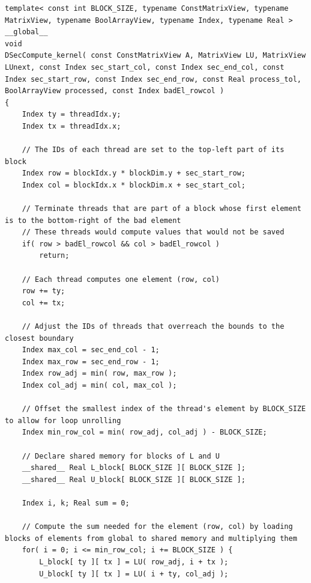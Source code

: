 \begin{lstlisting}[caption={The implementation of the \code{DSecCompute\_kernel()} kernel which computes one iteration of a diagonal section.
Note that the matrices, vectors, and arrays are passed using their views, and the scalar values are copied to the local memory of each thread.},label={Listing:implementation->decomposition-project->implemented-solutions->decomposers->ICMxPP->kernels->diagonal-compute},escapechar=@]
template< const int BLOCK_SIZE, typename ConstMatrixView, typename MatrixView, typename BoolArrayView, typename Index, typename Real >
__global__
void
DSecCompute_kernel( const ConstMatrixView A, MatrixView LU, MatrixView LUnext, const Index sec_start_col, const Index sec_end_col, const Index sec_start_row, const Index sec_end_row, const Real process_tol, BoolArrayView processed, const Index badEl_rowcol )
{
	Index ty = threadIdx.y;
	Index tx = threadIdx.x;
	
	// The IDs of each thread are set to the top-left part of its block
	Index row = blockIdx.y * blockDim.y + sec_start_row;
	Index col = blockIdx.x * blockDim.x + sec_start_col;
	
	// Terminate threads that are part of a block whose first element is to the bottom-right of the bad element
	// These threads would compute values that would not be saved
	if( row > badEl_rowcol && col > badEl_rowcol )
		return;
	
	// Each thread computes one element (row, col)
	row += ty;
	col += tx;
	
	// Adjust the IDs of threads that overreach the bounds to the closest boundary
	Index max_col = sec_end_col - 1;
	Index max_row = sec_end_row - 1;
	Index row_adj = min( row, max_row );
	Index col_adj = min( col, max_col );
	
	// Offset the smallest index of the thread's element by BLOCK_SIZE to allow for loop unrolling
	Index min_row_col = min( row_adj, col_adj ) - BLOCK_SIZE;
	
	// Declare shared memory for blocks of L and U
	__shared__ Real L_block[ BLOCK_SIZE ][ BLOCK_SIZE ];
	__shared__ Real U_block[ BLOCK_SIZE ][ BLOCK_SIZE ];
	
	Index i, k; Real sum = 0;
	
	// Compute the sum needed for the element (row, col) by loading blocks of elements from global to shared memory and multiplying them
	for( i = 0; i <= min_row_col; i += BLOCK_SIZE ) {
		L_block[ ty ][ tx ] = LU( row_adj, i + tx );
		U_block[ ty ][ tx ] = LU( i + ty, col_adj );
		

\end{lstlisting}
